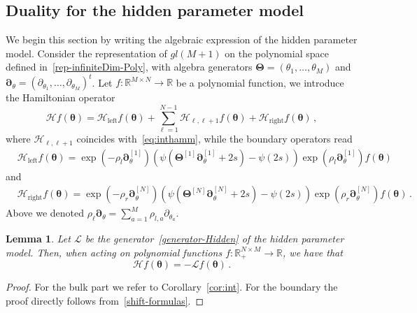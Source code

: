 \documentclass[11pt]{article}
\numberwithin{equation}{section}
\newtheorem{lemma}[theorem]{Lemma}
\newcommand{\M}{M}
\newcommand{\N}{N}
\newcommand{\ecH}{\bm{\mathscr{H}}}
\newcommand{\ecL}{\bm{\mathscr{L}}}
\newcommand{\hidden}{\theta}
\newcommand{\Hidden}{\Theta}
\begin{document}
\subsection{Duality for the hidden parameter model}\label{subsection-hiddenDuality}

 We begin this section by writing the algebraic expression of the hidden parameter model. Consider the representation of $gl(\M+1)$ on the polynomial space defined in~\eqref{rep-infiniteDim-Poly}, with algebra generators $\bm{\Hidden}=(\hidden_{1},\ldots,\hidden_{\M})$ and $\bm{\partial}_{\hidden}=(\partial_{\hidden_1},\ldots,\partial_{\hidden_\M})^{t}$. Let $f:\mathbb{R}^{\M\times \N}\to \mathbb{R}$ be a polynomial function, we introduce the Hamiltonian operator
 \begin{equation}\label{algebraic-Hidden}
 		\ecH f(\bm{\hidden}) =\ecH _{\text{left}}f(\bm{\hidden})+\sum_{\ell=1}^{\N-1}\ecH_{\ell,\ell+1}f(\bm{\hidden})+\ecH _{\text{right}}f(\bm{\hidden})\,,
 \end{equation}
  where $\ecH_{\ell,\ell+1}$ coincides with~\eqref{eq:inthamm}, while the boundary operators read
 \begin{equation}\label{hleftt4-alg}
 	\begin{split}
 		&\ecH _{\text{left}}f(\bm{\hidden})=\exp{\left(-\rho_{l}\bm{\partial}^{[1]}_{\hidden}\right)}\left(\psi(\bm{\Hidden}^{[1]}\bm{\partial}_{\hidden}^{[1]}+2s)-\psi(2s)\right)
 		\exp{\left(\rho_{l}\bm{\partial}^{[1]}_{\hidden}\right)}f(\bm{\hidden})
          	\end{split}
 \end{equation}
 and 
 \begin{equation} 	\begin{split}
 		&\ecH _{\text{right}}f(\bm{\hidden})=\exp{\left(-\rho_{r}\bm{\partial}^{[\N]}_{\hidden}\right)}\left(\psi(\bm{\Hidden}^{[\N]}\bm{\partial}^{[\N]}_{\hidden}+2s)-\psi(2s)\right)
 		\exp{\left(\rho_{r}\bm{\partial}^{[\N]}_{\hidden}\right)}f(\bm{\hidden})\,.
          	\end{split}
 \end{equation}
 Above we denoted $\rho_{\ell}\bm{\partial}_{\hidden}=\sum_{a=1}^{\M}\rho_{l,a}\partial_{\hidden_a}$. 
  \begin{lemma}
     Let $\ecL$ be the generator~\eqref{generator-Hidden} of the hidden parameter model. Then, when acting on polynomial functions $f:\mathbb{R}_{+}^{\N\times \M}\to \mathbb{R}$, we have that 
    \begin{equation}
        \ecH f(\bm{\hidden})=-\ecL f(\bm{\hidden})\,.
    \end{equation}
 \end{lemma}
 \begin{proof}
     For the bulk part we refer to Corollary~\ref{cor:int}. For the boundary the proof directly follows from~\eqref{shift-formulas}. 
 \end{proof}
\end{document}
